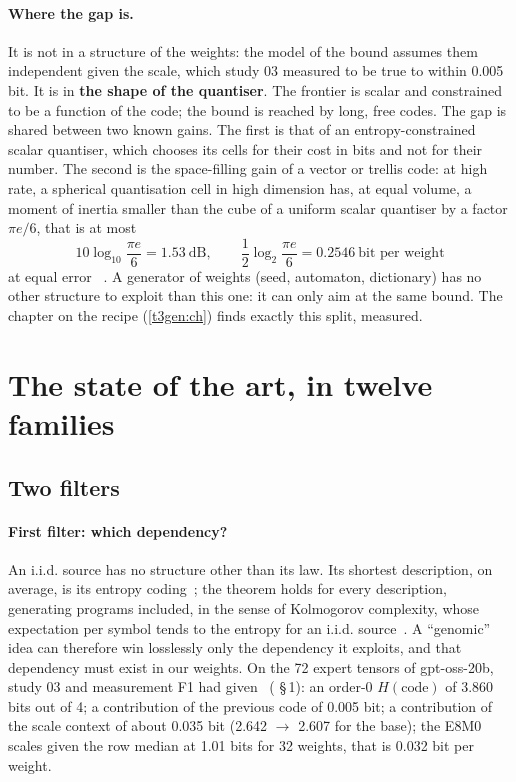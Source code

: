 \paragraph{Where the gap is.} It is not in a structure of the weights: the model of the bound assumes them independent given the scale, which study 03 measured to be true to within 0.005 bit. It is in \textbf{the shape of the quantiser}. The frontier is scalar and constrained to be a function of the code; the bound is reached by long, free codes. The gap is shared between two known gains. The first is that of an entropy-constrained scalar quantiser, which chooses its cells for their cost in bits and not for their number. The second is the space-filling gain of a vector or trellis code: at high rate, a spherical quantisation cell in high dimension has, at equal volume, a moment of inertia smaller than the cube of a uniform scalar quantiser by a factor $\pi e / 6$, that is at most
\begin{equation}\label{t3que:eq:pavage}
10 \log_{10} \frac{\pi e}{6} = 1.53\ \text{dB}, \qquad \frac12 \log_2 \frac{\pi e}{6} = 0.2546\ \text{bit per weight}
\end{equation}
at equal error \calc~\cite{gish1968,marcellin1990}. A generator of weights (seed, automaton, dictionary) has no other structure to exploit than this one: it can only aim at the same bound. The chapter on the recipe (\cref{t3gen:ch}) finds exactly this split, measured.

\section{The state of the art, in twelve families}\label{t3que:sec:familles}

\subsection{Two filters}

\paragraph{First filter: which dependency?} An i.i.d. source has no structure other than its law. Its shortest description, on average, is its entropy coding~\cite{shannon1948}; the theorem holds for every description, generating programs included, in the sense of Kolmogorov complexity, whose expectation per symbol tends to the entropy for an i.i.d. source~\cite[chapter 14]{cover2006}. A ``genomic'' idea can therefore win losslessly only the dependency it exploits, and that dependency must exist in our weights. On the 72 expert tensors of gpt-oss-20b, study 03 and measurement F1 had given \mes~( §\,1): an order-0 $H(\text{code})$ of 3.860 bits out of 4; a contribution of the previous code of 0.005 bit; a contribution of the scale context of about 0.035 bit (2.642 $\to$ 2.607 for the base); the E8M0 scales given the row median at 1.01 bits for 32 weights, that is 0.032 bit per weight.

